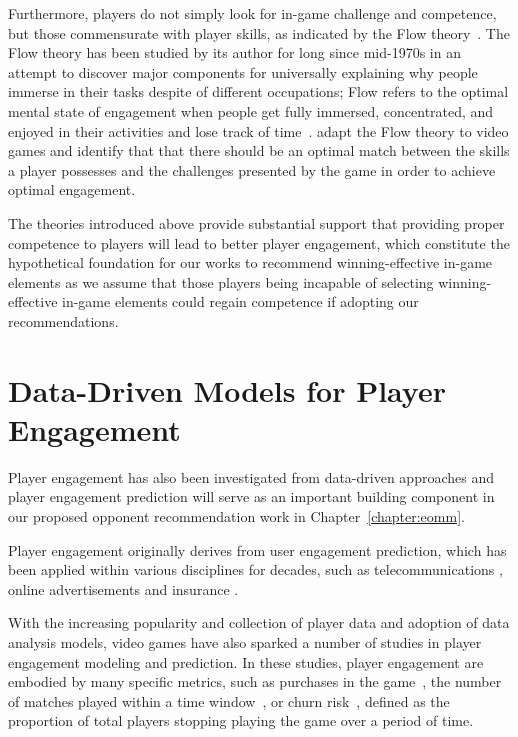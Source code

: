 Furthermore, players do not simply look for in-game challenge and competence, but those commensurate with player skills, as indicated by the Flow theory~\cite{flow1990psychology}. The Flow theory has been studied by its author for long since mid-1970s in an attempt to discover major components for universally explaining why people immerse in their tasks despite of different occupations; Flow refers to the optimal mental state of engagement when people get fully immersed, concentrated, and enjoyed in their activities and lose track of time~\cite{flow1990psychology}. \cite{sweetser2005gameflow,chen2007flow} adapt the Flow theory to video games and identify that that there should be an optimal match between the skills a player possesses and the challenges presented by the game in order to achieve optimal engagement. 

The theories introduced above provide substantial support that providing proper competence to players will lead to better player engagement, which constitute the hypothetical foundation for our works to recommend winning-effective in-game elements as we assume that those players being incapable of selecting winning-effective in-game elements could regain competence if adopting our recommendations. 

\section{Data-Driven Models for Player Engagement}\label{sec:rw_data_player_engage}

Player engagement has also been investigated from data-driven approaches and player engagement prediction will serve as an important building component in our proposed opponent recommendation work in Chapter~\ref{chapter:eomm}. 

Player engagement originally derives from user engagement prediction, which has been applied within various disciplines for decades, such as telecommunications \cite{ferreira2004data}, online advertisements \cite{yoon2010prediction} and insurance \cite{morik2004analysing}. 

With the increasing popularity and collection of player data and adoption of data analysis models, video games have also sparked a number of studies in player engagement modeling and prediction. In these studies, player engagement are embodied by many specific metrics, such as purchases in the game~\cite{xie2015predicting,sifa2015predicting}, the number of matches played within a time window~\cite{xue2017dynamic,weber2011modeling}, or churn risk~\cite{hadiji2014predicting,harrison2012players}, defined as the proportion of total players stopping playing the game over a period of time. 

